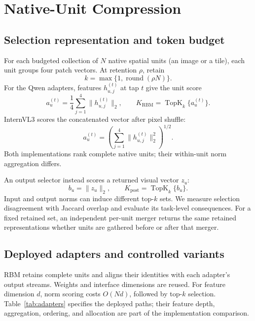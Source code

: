 \documentclass[10pt,twocolumn,letterpaper]{article}
\begin{document}
\section{Native-Unit Compression}
\subsection{Selection representation and token budget}
For each budgeted collection of $N$ native spatial units (an image or a tile), each unit groups four patch vectors. At retention $\rho$, retain
\begin{equation}
k=\max\{1,\operatorname{round}(\rho N)\}.
\end{equation}
For the Qwen adapters, features $h^{(t)}_{u,j}$ at tap $t$ give the unit score
\begin{equation}
a_u^{(t)}=\frac{1}{4}\sum_{j=1}^{4}\|h^{(t)}_{u,j}\|_2,
\qquad K_{\mathrm{RBM}}=\operatorname{TopK}_k\{a_u^{(t)}\}.
\label{eq:pre}
\end{equation}
InternVL3 scores the concatenated vector after pixel shuffle:
\begin{equation}
a_u^{(t)}=\left(\sum_{j=1}^{4}\|h^{(t)}_{u,j}\|_2^2\right)^{1/2}.
\label{eq:intern}
\end{equation}
Both implementations rank complete native units; their within-unit norm aggregation differs.

An output selector instead scores a returned visual vector $z_u$:
\begin{equation}
b_u=\|z_u\|_2,\qquad
K_{\mathrm{post}}=\operatorname{TopK}_k\{b_u\}.
\label{eq:post}
\end{equation}
Input and output norms can induce different top-$k$ sets. We measure selection disagreement with Jaccard overlap and evaluate its task-level consequences. For a fixed retained set, an independent per-unit merger returns the same retained representations whether units are gathered before or after that merger.

\subsection{Deployed adapters and controlled variants}
RBM retains complete units and aligns their identities with each adapter's output streams. Weights and interface dimensions are reused. For feature dimension $d$, norm scoring costs $O(Nd)$, followed by top-$k$ selection. Table~\ref{tab:adapters} specifies the deployed paths; their feature depth, aggregation, ordering, and allocation are part of the implementation comparison.
\end{document}

